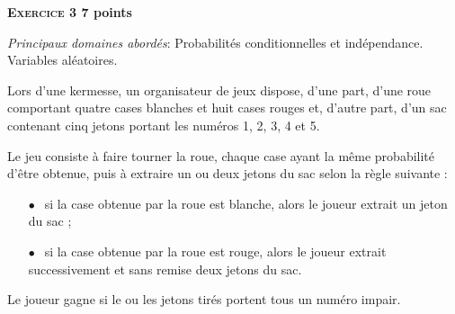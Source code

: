 \documentclass[12pt]{book}
\begin{document}
\textbf{\textsc{Exercice 3} \hfill 7 points}

\medskip

\emph{Principaux domaines abordés}: Probabilités conditionnelles et indépendance. Variables aléatoires.

\medskip

Lors d'une kermesse, un organisateur de jeux dispose, d'une part, d'une roue comportant quatre cases blanches et huit cases rouges et, d'autre part, d'un sac contenant cinq jetons portant les numéros 1, 2, 3, 4 et 5.

Le jeu consiste à faire tourner la roue, chaque case ayant la même probabilité d'être obtenue, puis à extraire un ou deux jetons du sac selon la règle suivante :

\setlength\parindent{1cm}
\begin{itemize}
\item[$\bullet~~$] si la case obtenue par la roue est blanche, alors le joueur extrait un jeton du sac ;
\item[$\bullet~~$] si la case obtenue par la roue est rouge, alors le joueur extrait successivement et sans remise deux jetons du sac.
\end{itemize}
\setlength\parindent{0cm}

Le joueur gagne si le ou les jetons tirés portent tous un numéro impair.

\medskip
\end{document}
